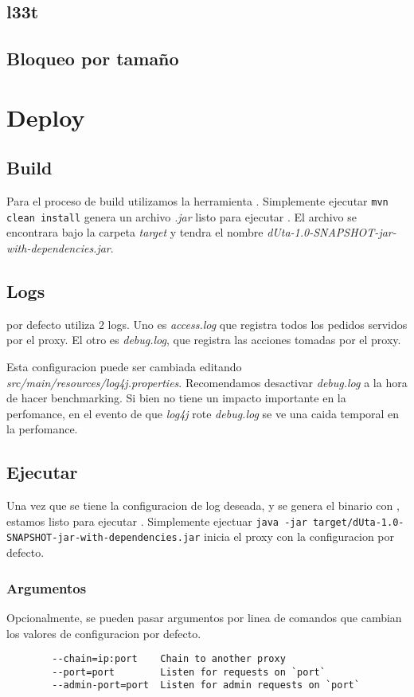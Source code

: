 \documentclass[11pt,a4paper,titlepage]{article}
\begin{document}
    \subsection{l33t}

    \subsection{Bloqueo por tamaño}


\section{Deploy}
    \subsection{Build}
    Para el proceso de build utilizamos la herramienta .
    Simplemente ejecutar \texttt{mvn clean install} genera un archivo \textit{.jar} listo para ejecutar \duta.
    El archivo se encontrara bajo la carpeta \textit{target} y tendra el nombre \textit{dUta-1.0-SNAPSHOT-jar-with-dependencies.jar}.

    \subsection{Logs}
    \duta por defecto utiliza 2 logs.
    Uno es \textit{access.log} que registra todos los pedidos servidos por el proxy.
    El otro es \textit{debug.log}, que registra las acciones tomadas por el proxy.

    Esta configuracion puede ser cambiada editando \textit{src/main/resources/log4j.properties}.
    Recomendamos desactivar \textit{debug.log} a la hora de hacer benchmarking.
    Si bien no tiene un impacto importante en la perfomance, en el evento de que \textit{log4j} rote \textit{debug.log} se ve una caida temporal en la perfomance.

    \subsection{Ejecutar \duta}
    Una vez que se tiene la configuracion de log deseada, y se genera el binario con , estamos listo para ejecutar \duta.
    Simplemente ejectuar \texttt{java -jar target/dUta-1.0-SNAPSHOT-jar-with-dependencies.jar} inicia el proxy con la configuracion por defecto.

    \subsubsection{Argumentos}
    Opcionalmente, se pueden pasar argumentos por linea de comandos que cambian los valores de configuracion por defecto.
    \begin{verbatim}
        --chain=ip:port    Chain to another proxy
        --port=port        Listen for requests on `port`
        --admin-port=port  Listen for admin requests on `port`
    \end{verbatim}
\end{document}
